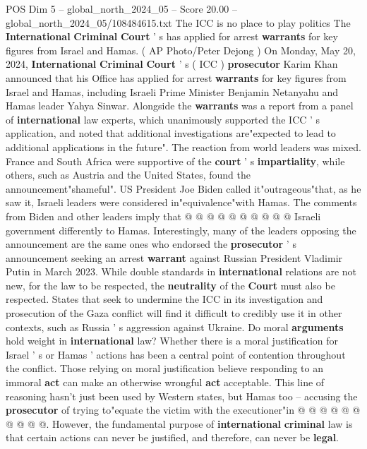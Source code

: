 \begin{textsample}{POS Dim 5 – global\_north\_2024\_05 – Score 20.00 – global\_north\_2024\_05/108484615.txt}  \label{ex:f5_pos_164}
The ICC is no place to play politics The \textbf{International} \textbf{Criminal} \textbf{Court} ' s has applied for arrest \textbf{warrants} for key figures from Israel and Hamas. ( AP Photo/Peter Dejong ) On Monday, May 20, 2024, \textbf{International} \textbf{Criminal} \textbf{Court} ' s ( ICC ) \textbf{prosecutor} Karim Khan announced that his Office has applied for arrest \textbf{warrants} for key figures from Israel and Hamas, including Israeli Prime Minister Benjamin Netanyahu and Hamas leader Yahya Sinwar.
Alongside the \textbf{warrants} was a report from a panel of \textbf{international} law experts, which unanimously supported the ICC ' s application, and noted that additional investigations are"expected to lead to additional applications in the future".
The reaction from world leaders was mixed.
France and South Africa were supportive of the \textbf{court} ' s \textbf{impartiality}, while others, such as Austria and the United States, found the announcement"shameful".
US President Joe Biden called it"outrageous"that, as he saw it, Israeli leaders were considered in"equivalence"with Hamas.
The comments from Biden and other leaders imply that @ @ @ @ @ @ @ @ @ @ Israeli government differently to Hamas.
Interestingly, many of the leaders opposing the announcement are the same ones who endorsed the \textbf{prosecutor} ' s announcement seeking an arrest \textbf{warrant} against Russian President Vladimir Putin in March 2023.
While double standards in \textbf{international} relations are not new, for the law to be respected, the \textbf{neutrality} of the \textbf{Court} must also be respected.
States that seek to undermine the ICC in its investigation and prosecution of the Gaza conflict will find it difficult to credibly use it in other contexts, such as Russia ' s aggression against Ukraine.
Do moral \textbf{arguments} hold weight in \textbf{international} law?
Whether there is a moral justification for Israel ' s or Hamas ' actions has been a central point of contention throughout the conflict.
Those relying on moral justification believe responding to an immoral \textbf{act} can make an otherwise wrongful \textbf{act} acceptable.
This line of reasoning hasn't just been used by Western states, but Hamas too -- accusing the \textbf{prosecutor} of trying to"equate the victim with the executioner"in @ @ @ @ @ @ @ @ @ @.
However, the fundamental purpose of \textbf{international} \textbf{criminal} law is that certain actions can never be justified, and therefore, can never be \textbf{legal}.

\end{textsample}
